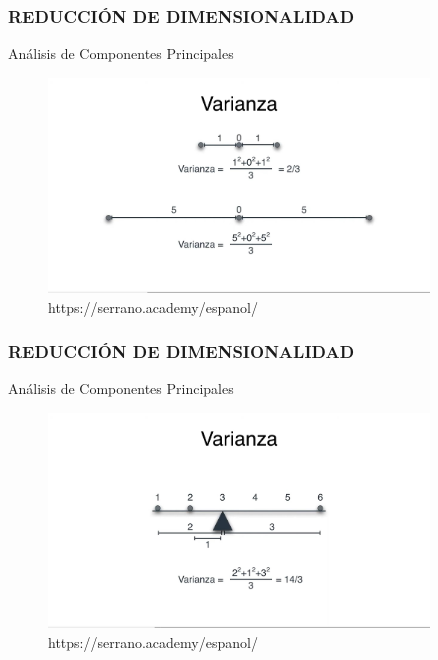 \documentclass{beamer}
\begin{document}
\begin{frame}
	\frametitle{REDUCCIÓN DE DIMENSIONALIDAD}
	\begin{block}{Análisis de Componentes Principales}	
		\begin{figure}
			\includegraphics[width=0.9\textwidth]{PCA/IMG_3547.jpg}
			\caption{https://serrano.academy/espanol/}
		\end{figure}
	\end{block}
\end{frame}


\begin{frame}
	\frametitle{REDUCCIÓN DE DIMENSIONALIDAD}
	\begin{block}{Análisis de Componentes Principales}	
		\begin{figure}
			\includegraphics[width=0.9\textwidth]{PCA/IMG_3549.jpg}
			\caption{https://serrano.academy/espanol/}
		\end{figure}
	\end{block}
\end{frame}
\end{document}
